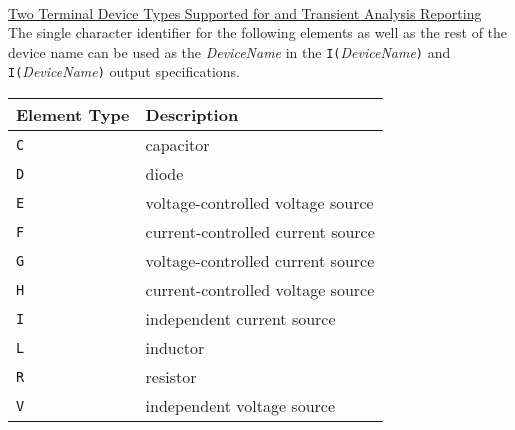 \hspace*{\fill}\\[0.1in]

\noindent\underline{Two Terminal Device Types Supported for \dc and
Transient Analysis Reporting}\\[0.1in]
The single character identifier  for the following elements
as well as the rest of the device name can be used as the {\it DeviceName}
in the {\tt I(}{\it DeviceName}{\tt )}  and {\tt I(}{\it DeviceName}{\tt )}
output specifications.\\
\hspace*{\fill}
\begin{tabular}{|p{1in}|p{3in}|}
\hline
Element Type & Description\\
\hline
{\tt C} & capacitor\\
{\tt D} & diode\\
{\tt E} & voltage-controlled voltage source\\
{\tt F} & current-controlled current source\\
{\tt G} & voltage-controlled current source\\
{\tt H} & current-controlled voltage source\\
{\tt I} & independent current source\\
{\tt L} & inductor\\
{\tt R} & resistor\\
{\tt V} & independent voltage source\\
\hline
\end{tabular}\\[0.1in]

